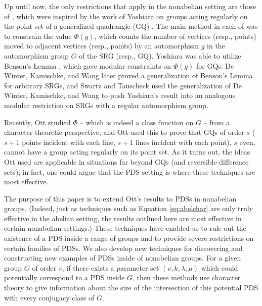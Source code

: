 \documentclass[12pt]{amsproc} %
\theoremstyle{definition}\newtheorem{defn}[thm]{Definition}
\theoremstyle{definition}\newtheorem{rem}[thm]{Remark}
\theoremstyle{definition}\newtheorem{ex}[thm]{Example}
\begin{document}
Up until now, the only restrictions that apply in the nonabelian setting are those of \cite{swartz-tauscheck}, which were inspired by the work of Yoshiara on groups acting regularly on the point set of a generalized quadrangle (GQ) \cite{yoshiara}. The main method in each of \cite{swartz-tauscheck, yoshiara} was to constrain the value $\Phi(g)$, which counts the number of vertices (resp., points) moved to adjacent vertices (resp., points) by an automorphism $g$ in the automorphism group $G$ of the SRG (resp., GQ). Yoshiara was able to utilize Benson's Lemma \cite[Lemma 4.3]{benson}, which gave modular constraints on $\Phi(g)$ for GQs. De Winter, Kamischke, and Wang \cite{dewinter-kamischke-wang} later proved a generalization of Benson's Lemma for arbitrary SRGs, and Swartz and Tauscheck \cite{swartz-tauscheck} used the generalization of De Winter, Kamischke, and Wang to push Yoshiara's result into an analogous modular restriction on SRGs with a regular automorphism group.

Recently, Ott \cite{ott} studied $\Phi$ -- which is indeed a class function on $G$ -- from a character-theoretic perspective, and Ott used this to prove that GQs of order $s$ ($s+1$ points incident with each line, $s+1$ lines incident with each point), $s$ even, cannot have a group acting regularly on its point set. As it turns out, the ideas Ott used are applicable in situations far beyond GQs (and reversible difference sets); in fact, one could argue that the PDS setting is where these techniques are most effective.

The purpose of this paper is to extend Ott's results to PDSs in nonabelian groups. (Indeed, just as techniques such as Equation \eqref{eq:abelchar} are only truly effective in the abelian setting, the results outlined here are most effective in certain nonabelian settings.) These techniques have enabled us to rule out the existence of a PDS inside a range of groups and to provide severe restrictions on certain families of PDSs. We also develop new techniques for discovering and constructing new examples of PDSs inside of nonabelian groups. For a given group $G$ of order $v$, if there exists a parameter set $(v, k, \lambda, \mu)$ which could potentially correspond to a PDS inside $G$, then these methods use character theory to give information about the size of the intersection of this potential PDS with every conjugacy class of $G$.
\end{document}
